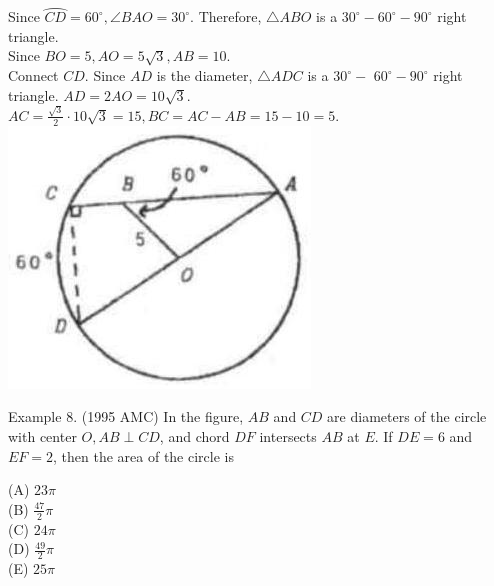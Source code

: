 \documentclass[10pt]{article}
\begin{document}
Since \(\wideparen{C D}=60^{\circ}, \angle B A O=30^{\circ}\). Therefore, \(\triangle A B O\) is a \(30^{\circ}-60^{\circ}-90^{\circ}\) right triangle.\\
Since \(B O=5, A O=5 \sqrt{3}, A B=10\).\\
Connect \(C D\). Since \(A D\) is the diameter, \(\triangle A D C\) is a \(30^{\circ}-\) \(60^{\circ}-90^{\circ}\) right triangle. \(A D=2 A O=10 \sqrt{3}\).\\
\(A C=\frac{\sqrt{3}}{2} \cdot 10 \sqrt{3}=15, B C=A C-A B=15-10=5\).\\
\includegraphics[max width=\textwidth, center]{2025_04_17_97bc1f7e44d93c271a88g-166(2)}

Example 8. (1995 AMC) In the figure, \(A B\) and \(C D\) are diameters of the circle with center \(O, A B \perp C D\), and chord \(D F\) intersects \(A B\) at \(E\). If \(D E=6\) and \(E F=2\), then the area of the circle is


(A) \(23 \pi\)\\
(B) \(\frac{47}{2} \pi\)\\
(C) \(24 \pi\)\\
(D) \(\frac{49}{2} \pi\)\\
(E) \(25 \pi\)
\end{document}
